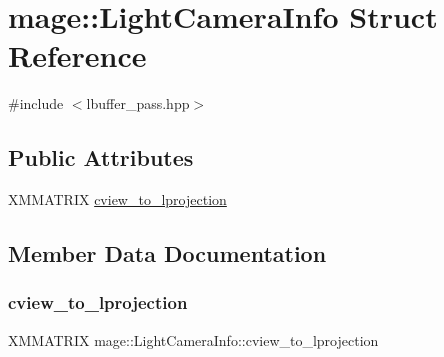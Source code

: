\hypertarget{structmage_1_1_light_camera_info}{}\section{mage\+:\+:Light\+Camera\+Info Struct Reference}
\label{structmage_1_1_light_camera_info}


{\ttfamily \#include $<$lbuffer\+\_\+pass.\+hpp$>$}

\subsection*{Public Attributes}
\begin{DoxyCompactItemize}
\item 
X\+M\+M\+A\+T\+R\+IX \hyperlink{structmage_1_1_light_camera_info_abb4a7fbcc59c50a192c2c77d653f388d}{cview\+\_\+to\+\_\+lprojection}
\end{DoxyCompactItemize}


\subsection{Member Data Documentation}
\hypertarget{structmage_1_1_light_camera_info_abb4a7fbcc59c50a192c2c77d653f388d}{}\label{structmage_1_1_light_camera_info_abb4a7fbcc59c50a192c2c77d653f388d} 
\subsubsection{\texorpdfstring{cview\+\_\+to\+\_\+lprojection}{cview\_to\_lprojection}}
{\footnotesize\ttfamily X\+M\+M\+A\+T\+R\+IX mage\+::\+Light\+Camera\+Info\+::cview\+\_\+to\+\_\+lprojection}

